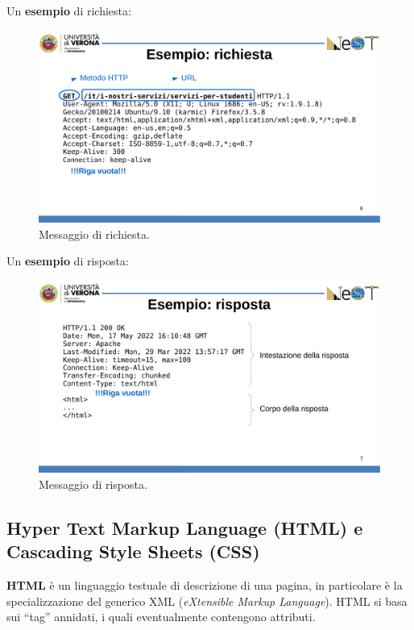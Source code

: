 \documentclass[a4paper]{article}
\newcommand{\dquotes}[1]{``#1''}
\begin{document}
	\noindent
	Un \textcolor{Green4}{\textbf{esempio}} di richiesta:
	\begin{figure}[!htp]
		\centering
		\includegraphics[width=\textwidth]{img/richiesta_http.pdf}
		\caption{Messaggio di richiesta.}
	\end{figure}

	\noindent
	Un \textcolor{Green4}{\textbf{esempio}} di risposta:
	\begin{figure}[!htp]
		\centering
		\includegraphics[width=\textwidth]{img/risposta_http.pdf}
		\caption{Messaggio di risposta.}
	\end{figure}\newpage

	\subsection{Hyper Text Markup Language (HTML) e Cascading Style Sheets (CSS)}
	
	\textcolor{Red3}{\textbf{HTML}} è un linguaggio testuale di descrizione di una pagina, in particolare è la specializzazione del generico XML (\emph{eXtensible Markup Language}). HTML si basa sui \dquotes{tag} annidati, i quali eventualmente contengono attributi.\newline
	
\end{document}
